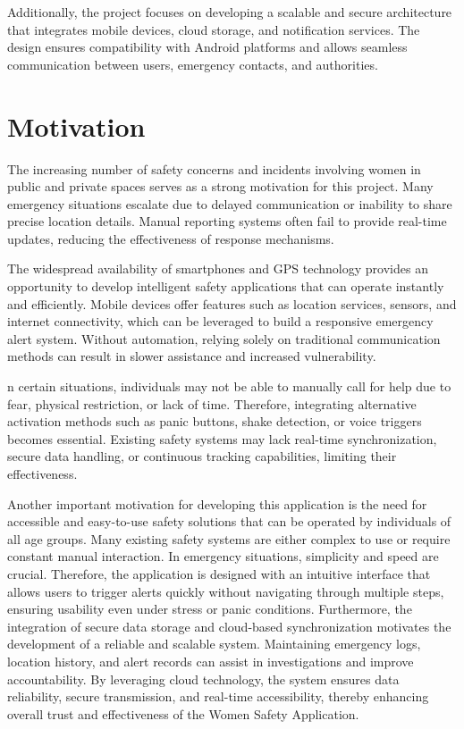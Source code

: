 \documentclass[a4paper,12pt]{report}
\begin{document}
\par Additionally, the project focuses on developing a scalable and secure architecture that integrates mobile devices, cloud storage, and notification services. The design ensures compatibility with Android platforms and allows seamless communication between users, emergency contacts, and authorities.

\section{Motivation}

\par The increasing number of safety concerns and incidents involving women in public and
private spaces serves as a strong motivation for this project. Many emergency situations
escalate due to delayed communication or inability to share precise location details. Manual reporting systems often fail to provide real-time updates, reducing the effectiveness
of response mechanisms.\\

\par The widespread availability of smartphones and GPS technology provides an opportunity to develop intelligent safety applications that can operate instantly and efficiently.
Mobile devices offer features such as location services, sensors, and internet connectivity,
which can be leveraged to build a responsive emergency alert system. Without automation, relying solely on traditional communication methods can result in slower assistance
and increased vulnerability.\\

\par n certain situations, individuals may not be able to manually call for help due to fear,
physical restriction, or lack of time. Therefore, integrating alternative activation methods
such as panic buttons, shake detection, or voice triggers becomes essential. Existing safety
systems may lack real-time synchronization, secure data handling, or continuous tracking
capabilities, limiting their effectiveness.\\

\par Another important motivation for developing this application is the need for accessible and easy-to-use safety solutions that can be operated by individuals of all age groups.
Many existing safety systems are either complex to use or require constant manual interaction. In emergency situations, simplicity and speed are crucial. Therefore, the application
is designed with an intuitive interface that allows users to trigger alerts quickly without
navigating through multiple steps, ensuring usability even under stress or panic conditions.
Furthermore, the integration of secure data storage and cloud-based synchronization
motivates the development of a reliable and scalable system. Maintaining emergency logs,
location history, and alert records can assist in investigations and improve accountability.
By leveraging cloud technology, the system ensures data reliability, secure transmission,
and real-time accessibility, thereby enhancing overall trust and effectiveness of the Women
Safety Application.
\end{document}
